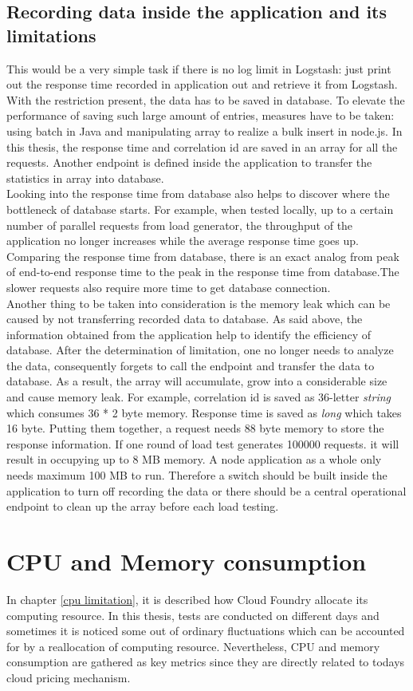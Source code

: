   \subsection{Recording data inside the application and its limitations}
This would be a very simple task if there is no log limit in Logstash: just print out the response time recorded in application out and retrieve it from Logstash. With the restriction present, the data has to be saved in database. To elevate the performance of saving such large amount of entries, measures have to be taken: using batch in Java and manipulating array to realize a bulk insert in node.js. In this thesis, the response time and correlation id are saved in an array for all the requests. Another endpoint is defined inside the application to transfer the statistics in array into database.\\
Looking into the response time from database also helps to discover where the bottleneck of database starts. For example, when tested locally, up to a certain number of parallel requests from load generator, the throughput of the application no longer increases while the average response time goes up. Comparing the response time from database, there is an exact analog from peak of end-to-end response time to the peak in the response time from database.The slower requests also require more time to get database connection. \\
Another thing to be taken into consideration is the memory leak which can be caused by not transferring recorded data to database. As said above, the information obtained from the application help to identify the efficiency of database. After the determination of limitation, one no longer needs to analyze the data,  consequently forgets to call the endpoint and transfer the data to database. As a result, the array will accumulate, grow into a considerable size and cause memory leak. For example, correlation id is saved as 36-letter \textit{string} which consumes 36 * 2 byte memory. Response time is saved as \textit{long} which takes 16 byte. Putting them together, a request needs 88 byte memory to store the response information. If one round of load test generates 100000 requests. it will result in occupying up to 8 MB memory. A node application as a whole only needs maximum 100 MB to run. Therefore a switch should be built inside the application to turn off recording the data or there should be a central operational endpoint to clean up the array before each load testing. 
\section{CPU and Memory consumption}
In chapter \ref{cpu limitation}, it is described how Cloud Foundry allocate its computing resource. In this thesis, tests are conducted on different days and sometimes it is noticed some out of ordinary fluctuations which can be accounted for by a reallocation of computing resource. Nevertheless, CPU and memory consumption are gathered as key metrics since they are directly related to todays cloud pricing mechanism.
